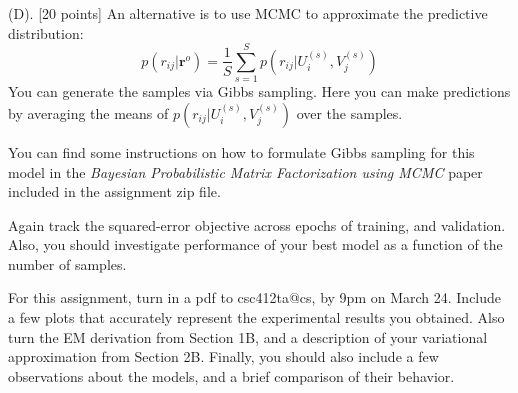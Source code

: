 \documentclass[12pt]{article}
\newcommand{\rr}{\mathbf{r}}
\begin{document}
(D). [20 points]
An alternative is to use MCMC to approximate the predictive
distribution:
\[
p(r_{ij}|\rr^o) = \frac{1}{S} \sum_{s=1}^S p(r_{ij}|U_i^{(s)},V_j^{(s)}) 
\]
You can generate the samples via Gibbs sampling.
Here you can make predictions by averaging the means of
$p(r_{ij}|U_i^{(s)},V_j^{(s)})$ over the samples.

You can find some instructions on how to formulate Gibbs sampling
for this model in the {\em Bayesian Probabilistic Matrix Factorization
using MCMC} paper included in the assignment zip file. 

Again track the squared-error objective across epochs of training,
and validation.  Also, you should investigate
performance of your best model as a function of the number of samples.

\vspace{.3in}

For this assignment, turn in a pdf to csc412ta@cs, by 9pm on
March 24.  Include a few plots that accurately represent the
experimental results you obtained. Also turn the EM derivation
from Section 1B, and a description of
your variational approximation from Section 2B. Finally, 
you should also include a few 
observations about the models, and a brief comparison of their
behavior.
\end{document}
